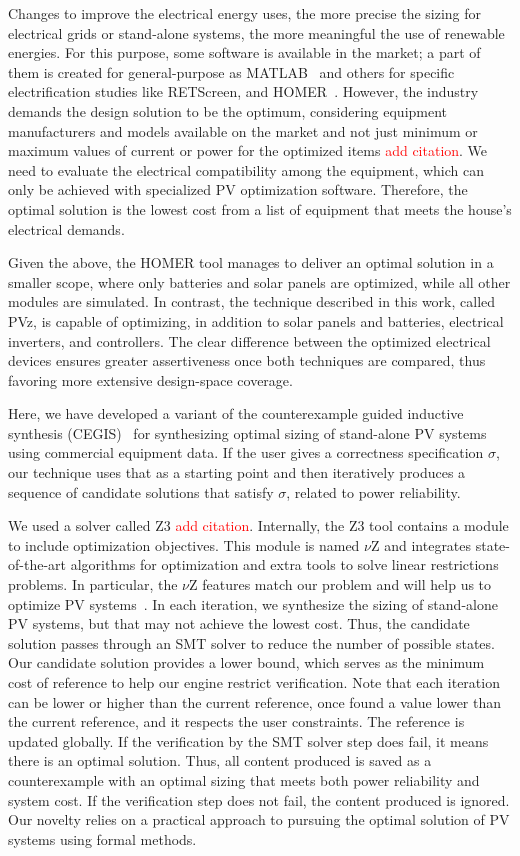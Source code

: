 \documentclass[10pt,journal,compsoc]{IEEEtran}
\begin{document}
Changes to improve the electrical energy uses, the more precise the sizing for electrical grids or stand-alone systems, the more meaningful the use of renewable energies. For this purpose, some software is available in the market; a part of them is created for general-purpose as MATLAB~\cite{Benatiallah2017} and others for specific electrification studies like RETScreen, and HOMER~\cite{Pradhan,Swarnkar}. However, the industry demands the design solution to be the optimum, considering equipment manufacturers and models available on the market and not just minimum or maximum values of current or power for the optimized items \textcolor{red}{add citation}. We need to evaluate the electrical compatibility among the equipment, which can only be achieved with specialized PV optimization software. Therefore, the optimal solution is the lowest cost from a list of equipment that meets the house's electrical demands.

Given the above, the HOMER tool manages to deliver an optimal solution in a smaller scope, where only batteries and solar panels are optimized, while all other modules are simulated. In contrast, the technique described in this work, called PVz, is capable of optimizing, in addition to solar panels and batteries, electrical inverters, and controllers. The clear difference between the optimized electrical devices ensures greater assertiveness once both techniques are compared, thus favoring more extensive design-space coverage.

Here, we have developed a variant of the counterexample guided inductive synthesis (CEGIS)~\cite{AbateCAV2018} for synthesizing optimal sizing of stand-alone PV systems using commercial equipment data. If the user gives a correctness specification $\sigma$, our technique uses that as a starting point and then iteratively produces a sequence of candidate solutions that satisfy $\sigma$, related to power reliability.
 
We used a solver called Z3 \textcolor{red}{add citation}. Internally, the Z3 tool contains a module to include optimization objectives. This module is named $\nu$Z and integrates state-of-the-art algorithms for optimization and extra tools to solve linear restrictions problems. In particular, the $\nu$Z features match our problem and will help us to optimize PV systems~\cite{BjornerPF15}. In each iteration, we synthesize the sizing of stand-alone PV systems, but that may not achieve the lowest cost. Thus, the candidate solution passes through an SMT solver to reduce the number of possible states. Our candidate solution provides a lower bound, which serves as the minimum cost of reference to help our engine restrict verification. Note that each iteration can be lower or higher than the current reference, once found a value lower than the current reference, and it respects the user constraints. The reference is updated globally. If the verification by the SMT solver step does fail, it means there is an optimal solution. Thus, all content produced is saved as a counterexample with an optimal sizing that meets both power reliability and system cost. If the verification step does not fail, the content produced is ignored. Our novelty relies on a practical approach to pursuing the optimal solution of PV systems using formal methods. 
\end{document}
